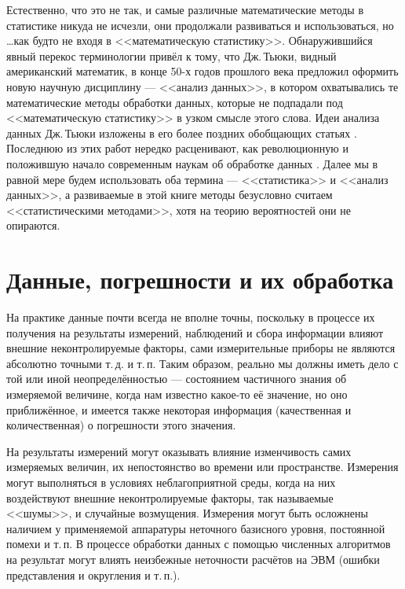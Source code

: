 \documentclass[a5paper,openany]{book}
\begin{document}
Естественно, что это не так, и самые различные математические методы в статистике 
никуда не исчезли, они продолжали развиваться и использоваться, но \ldots как будто 
не входя в <<математическую статистику>>. Обнаружившийся явный перекос терминологии 
привёл к тому, что Дж.\,Тьюки, видный американский математик, в конце 50-х годов 
прошлого века предложил оформить новую научную дисциплину --- <<анализ данных>>,
в котором охватывались те математические методы обработки 
данных, которые не подпадали под <<математическую статистику>> в узком смысле 
этого слова. Идеи анализа данных Дж.\,Тьюки изложены в его более поздних обобщающих 
статьях \cite{Tukey1962, Tukey1972}. Последнюю из этих работ нередко расценивают, 
как революционную и положившую начало современным наукам об обработке данных 
\cite{Donoho2017}. Далее мы в равной мере будем использовать оба термина --- 
<<статистика>> и <<анализ данных>>, а развиваемые в этой книге методы безусловно 
считаем <<статистическими методами>>, хотя на теорию вероятностей они не опираются. 
  
  
\section{Данные, погрешности и их обработка} 
  
  
На практике данные почти всегда не вполне точны, поскольку в процессе их получения 
на результаты измерений, наблюдений и сбора информации влияют внешние неконтролируемые 
факторы, сами измерительные приборы не являются абсолютно точными т.\,д. и т.\,п. 
Таким образом, реально мы должны иметь дело с той или иной неопределённостью --- 
состоянием частичного знания об измеряемой величине, когда нам известно какое-то 
её значение, но оно приближённое, и имеется также некоторая информация (качественная 
и количественная) о погрешности этого значения.   
   
На результаты измерений могут оказывать влияние изменчивость самих измеряемых величин, 
их непостоянство во времени или пространстве. Измерения могут выполняться в условиях 
неблагоприятной среды, когда на них воздействуют внешние неконтролируемые факторы, так 
называемые <<шумы>>, и случайные возмущения. Измерения могут быть осложнены наличием 
у применяемой аппаратуры неточного базисного уровня, постоянной помехи и т.\,п. 
В процессе обработки данных с помощью численных алгоритмов на результат могут влиять 
неизбежные неточности расчётов на ЭВМ (ошибки представления и округления и т.\,п.). 
  
\end{document}
